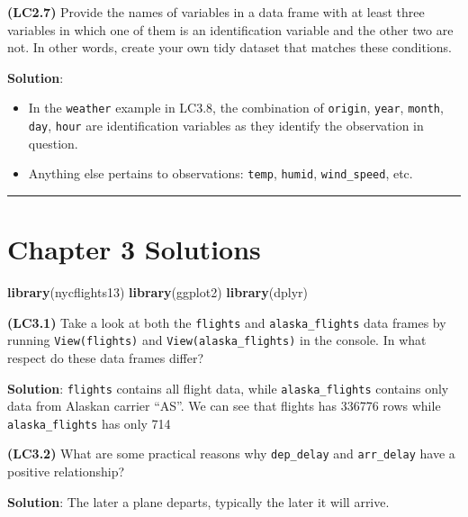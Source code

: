 \documentclass[12pt, krantz2,]{krantz}
\makeatletter
\newenvironment{Shaded}{\begin{snugshade}}{\end{snugshade}}
\newcommand{\KeywordTok}[1]{\textcolor[rgb]{0.27,0.27,0.27}{\textbf{#1}}}
\newcommand{\NormalTok}[1]{#1}
\providecommand{\tightlist}{%
  \setlength{\itemsep}{0pt}\setlength{\parskip}{0pt}}
\newenvironment{kframe}{%
\medskip{}
\setlength{\fboxsep}{.8em}
 \def\at@end@of@kframe{}%
 \ifinner\ifhmode%
  \def\at@end@of@kframe{\end{minipage}}%
  \begin{minipage}{\columnwidth}%
 \fi\fi%
 \def\FrameCommand##1{\hskip\@totalleftmargin \hskip-\fboxsep
 \colorbox{shadecolor}{##1}\hskip-\fboxsep
     \hskip-\linewidth \hskip-\@totalleftmargin \hskip\columnwidth}%
 \MakeFramed {\advance\hsize-\width
   \@totalleftmargin\z@ \linewidth\hsize
   \@setminipage}}%
 {\par\unskip\endMakeFramed%
 \at@end@of@kframe}
\renewenvironment{Shaded}{\begin{kframe}}{\end{kframe}}
\makeatother
\begin{document}
\textbf{(LC2.7)} Provide the names of variables in a data frame with at least three variables in which one of them is an identification variable and the other two are not. In other words, create your own tidy dataset that matches these conditions.

\textbf{Solution}:

\begin{itemize}
\tightlist
\item
  In the \texttt{weather} example in LC3.8, the combination of \texttt{origin}, \texttt{year}, \texttt{month}, \texttt{day}, \texttt{hour} are identification variables as they identify the observation in question.
\item
  Anything else pertains to observations: \texttt{temp}, \texttt{humid}, \texttt{wind\_speed}, etc.
\end{itemize}

\begin{center}\rule{0.5\linewidth}{\linethickness}\end{center}

\hypertarget{chapter-3-solutions}{%
\section{Chapter 3 Solutions}\label{chapter-3-solutions}}

\begin{Shaded}
\begin{Highlighting}[]
\KeywordTok{library}\NormalTok{(nycflights13)}
\KeywordTok{library}\NormalTok{(ggplot2)}
\KeywordTok{library}\NormalTok{(dplyr)}
\end{Highlighting}
\end{Shaded}

\textbf{(LC3.1)} Take a look at both the \texttt{flights} and \texttt{alaska\_flights} data frames by running \texttt{View(flights)} and \texttt{View(alaska\_flights)} in the console. In what respect do these data frames differ?

\textbf{Solution}: \texttt{flights} contains all flight data, while \texttt{alaska\_flights} contains only data from Alaskan carrier ``AS''. We can see that flights has 336776 rows while \texttt{alaska\_flights} has only 714

\textbf{(LC3.2)} What are some practical reasons why \texttt{dep\_delay} and \texttt{arr\_delay} have a positive relationship?

\textbf{Solution}: The later a plane departs, typically the later it will arrive.
\end{document}
